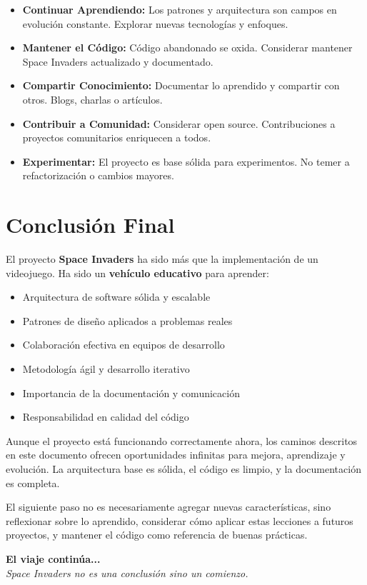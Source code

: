 \documentclass[12pt, a4paper]{article}
\begin{document}
\begin{itemize}[leftmargin=2em]
    \item \textbf{Continuar Aprendiendo:} Los patrones y arquitectura son campos en evolución constante. Explorar nuevas tecnologías y enfoques.
    
    \item \textbf{Mantener el Código:} Código abandonado se oxida. Considerar mantener Space Invaders actualizado y documentado.
    
    \item \textbf{Compartir Conocimiento:} Documentar lo aprendido y compartir con otros. Blogs, charlas o artículos.
    
    \item \textbf{Contribuir a Comunidad:} Considerar open source. Contribuciones a proyectos comunitarios enriquecen a todos.
    
    \item \textbf{Experimentar:} El proyecto es base sólida para experimentos. No temer a refactorización o cambios mayores.
\end{itemize}

\section{Conclusión Final}

El proyecto \textbf{Space Invaders} ha sido más que la implementación de un videojuego. Ha sido un \textbf{vehículo educativo} para aprender:

\begin{itemize}[leftmargin=2em]
    \item Arquitectura de software sólida y escalable
    \item Patrones de diseño aplicados a problemas reales
    \item Colaboración efectiva en equipos de desarrollo
    \item Metodología ágil y desarrollo iterativo
    \item Importancia de la documentación y comunicación
    \item Responsabilidad en calidad del código
\end{itemize}

Aunque el proyecto está funcionando correctamente ahora, los caminos descritos en este documento ofrecen oportunidades infinitas para mejora, aprendizaje y evolución. La arquitectura base es sólida, el código es limpio, y la documentación es completa.

El siguiente paso no es necesariamente agregar nuevas características, sino reflexionar sobre lo aprendido, considerar cómo aplicar estas lecciones a futuros proyectos, y mantener el código como referencia de buenas prácticas.

\vspace{2em}

\begin{center}
    \textcolor{verdeexito}{\textbf{El viaje continúa... 🚀}}\\[0.5em]
    {\textit{Space Invaders no es una conclusión sino un comienzo.}}
\end{center}
\end{document}
